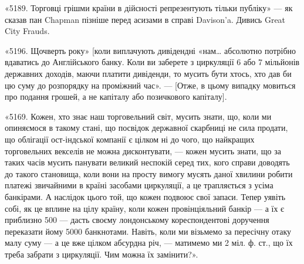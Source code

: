 «5189. Торговці грішми країни в дійсності репрезентують тільки публіку»
— як сказав пан Chapman пізніше перед асизами в справі Davison’a.
Дивись Great City Frauds.

«5196. Щочверть року» [коли виплачують дивідендні «нам\dots{} абсолютно
потрібно вдаватись до Англійського банку. Коли ви заберете з циркуляції 6 або
7 мільйонів державних доходів, маючи платити дивіденди, то мусить бути хтось,
хто дав би цю суму до розпорядку на проміжний час». — [Отже, в цьому випадку
мовиться про подання грошей, а не капіталу або позичкового капіталу].

«5169. Кожен, хто знає наш торговельний світ, мусить знати, що, коли
ми опиняємося в такому стані, що посвідок державної скарбниці не сила продати,
що облігації ост-індської компанії є цілком ні до чого, що найкращих
торговельних векселів не можна дисконтувати, — кожен мусить знати, що за таких
часів мусить панувати великий неспокій серед тих, кого справи доводять до
такого становища, коли вони на просту вимогу мусять даної хвилини робити
платежі звичайними в країні засобами циркуляції, а це трапляється з усіма
банкірами. А наслідок цього той, що кожен подвоює свої запаси. Тепер уявіть
собі, як це вплине на цілу країну, коли кожен провінціяльний банкір — а їх є
приблизно 500 — дасть своєму лондонському кореспондентові доручення переказати
йому 5000 банкнотами. Навіть, коли ми візьмемо за пересічну
отаку малу суму — а це вже цілком абсурдна річ, — матимемо ми 2 міл. ф. ст.,
що їх треба забрати з циркуляції. Чим можна їх замінити?».
